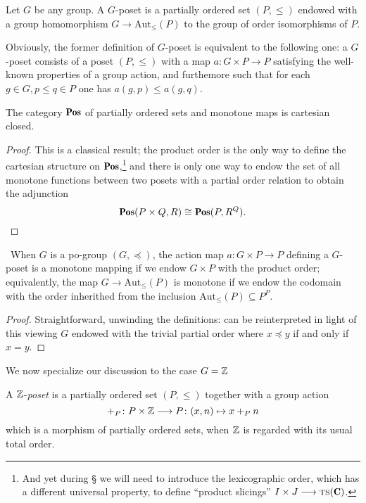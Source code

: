 \begin{definition}\label{def:g.poset}
Let $G$ be any group. A $G$-poset is a partially ordered set $(P, \le)$ endowed with a group homomorphism $G\to \text{Aut}_\le (P)$ to the group of order isomorphisms of $P$.
\end{definition}
\begin{remark}
Obviously, the former definition of $G$-poset is equivalent to the following one: a $G$-poset consists of a poset $(P,\le)$ with a map $a\colon G\times P\to P$ satisfying the well-known properties of a group action, and furthemore such that for each $g\in G, p\le q\in P$ one has $a(g,p)\le a(g,q)$.
\end{remark}
\begin{lemma}
The category $\cate{Pos}$ of partially ordered sets and monotone maps is cartesian closed.
\end{lemma}
\begin{proof}
This is a classical result; the product order is the only way to define the cartesian structure on $\cate{Pos}$,\footnote{And yet during \S{} we will need to introduce the lexicographic order, which has a different universal property, to define ``product slicings'' $I\times J \to \ts(\C)$.} and there is only one way to endow the set of all monotone functions between two posets with a partial order relation to obtain the adjunction
\[
\cate{Pos}(P\times Q, R)\cong \cate{Pos}(P, R^Q).\qedhere
\]
\end{proof}
\begin{proposition}\
When $G$ is a po-group $(G, \preceq)$, the action map $a\colon G\times P\to P$ defining a $G$-poset is a monotone mapping if we endow $G\times P$ with the product order; equivalently, the map $G\to \text{Aut}_\le(P)$ is monotone if we endow the codomain with the order inherithed from the inclusion $\text{Aut}_\le(P)\subseteq  P^P$.
\end{proposition}
\begin{proof}
Straightforward, unwinding the definitions: \adef {} can be reinterpreted in light of this viewing $G$ endowed with the trivial partial order where $x\preceq y$ if and only if $x=y$.
\end{proof}
We now specialize our discussion to the case $G=\mathbb{Z}$
\begin{definition}\label{zposet}
A $\mathbb{Z}$-\emph{poset} is a partially ordered set $(P,\leq)$ together with a group action 
\[
+_P\colon P\times \mathbb{Z} \longrightarrow P \colon (x,n) \mapsto x+_Pn 
\]
 which is a morphism of partially ordered sets, when $\mathbb{Z}$ is regarded with its usual total order.
\end{definition}
